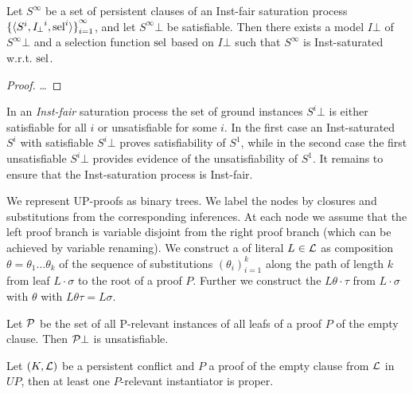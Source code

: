     \begin{lemma}
        Let \( S^\infty \) be a set of persistent clauses
        of an Inst-fair saturation process
        \( {\{ \langle S^i, {I\!_\bot}^i, \operatorname{sel}^i \rangle \}}_{i=1}^\infty \),
        and let \( S^\infty \! \bot \) be satisfiable.
        Then there exists a model \( I \! \bot \) of \( S^\infty \! \bot \)
        and a selection function \( \operatorname{sel} \) based on \( I \! \bot \)
        such that \(S^\infty \) is Inst-saturated w.r.t. \( \operatorname{sel} \).
    \end{lemma}

    \begin{proof} …
    \end{proof}


        In an \emph{Inst-fair} saturation process
        the set of ground instances
        \( S^i \! \bot \) is either satisfiable for all \( i \)
        or unsatisfiable for some \( i \).
        In the first case an Inst-saturated \( S^i \)
        with satisfiable \( S^i \! \bot \) proves satisfiability of \( S^1 \),
        while in the second case the first unsatisfiable \( S^i \! \bot \)
        provides evidence of the unsatisfiability of \( S^1 \).
%
    It remains to ensure that the Inst-saturation process is Inst-fair.


    We represent UP-proofs as binary trees.
    We label the nodes by closures
    and substitutions from the corresponding inferences.
    At each node we assume that the left proof branch
    is variable disjoint from the right proof branch
    (which can be achieved by variable renaming).
    We construct a 
    of literal \( L \in \mathcal{L} \)
    as composition \( \theta = \theta_1\ldots\theta_k \)
    of the sequence of substitutions \( {(\theta_i)}_{i=1}^k \)
    along the path of length \( k \)
    from leaf \( L\cdot\sigma \)
    to the root of a proof \( P \).
    Further we construct the 
    \( L\theta\cdot\tau \) from
    \( L \cdot \sigma \) with \( \theta \)
    with \( L\theta\tau = L\sigma \).


    \begin{lemma}
        Let \( \mathcal{P} \) be the set of all P-relevant instances
        of all leafs of a proof \( P \) of the empty clause.
        Then \( \mathcal{P} \bot \) is unsatisfiable.
    \end{lemma}

    \begin{corollary}
        Let \( (K, \mathcal{L}) \) be a persistent conflict
        and \( P \) a proof of the empty clause from \( \mathcal{L} \) in \( UP \),
        then at least one \(P\)-relevant instantiator is proper.
    \end{corollary}

